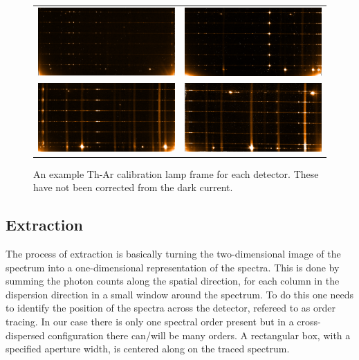 \begin{figure}
    \begin{tabular}{cc}
         \includegraphics[width=.45\hsize]{./figures/reduction/Thar_1.png} & \includegraphics[width=.45\hsize]{./figures/reduction/Thar_2.png} \\
         \includegraphics[width=.45\hsize]{./figures/reduction/Thar_3.png} & \includegraphics[width=.45\hsize]{./figures/reduction/Thar_4.png} \\
    \end{tabular}
   
    \caption{An example Th-Ar calibration lamp frame for each detector. These have not been corrected from the dark current.}
    \label{fig:caliblamps}
\end{figure}


\subsection{Extraction}
\label{subsec:extraction}
The process of extraction is basically turning the two-dimensional image of the spectrum into a one-dimensional representation of the spectra. This is done by summing the photon counts along the spatial direction, for each column in the dispersion direction in a small window around the spectrum. To do this one needs to identify the position of the spectra across the detector,  refereed to as {order tracing}. In our case there is only one spectral order present but in a cross-dispersed configuration there can/will be many orders. A rectangular box, with a specified aperture width, is centered along on the traced spectrum.
   
